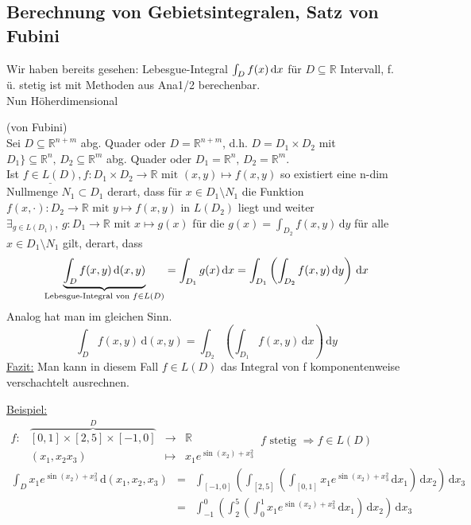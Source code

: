 \subsection{Berechnung von Gebietsintegralen, Satz von Fubini}
Wir haben bereits gesehen: Lebesgue-Integral $\int_{D} f(x) \,\text{d}x$ für $D \subseteq \mathbb{R}$ Intervall, f. ü. stetig ist mit Methoden aus Ana1/2 berechenbar.\\
Nun Höherdimensional\\
\begin{satz}(von Fubini)\\
    Sei $D \subseteq \mathbb{R}^{n+m}$ abg. Quader oder $D = \mathbb{R}^{n+m}$, d.h. $D = D_1 \times D_2$ mit $D_1 \}\subseteq \mathbb{R}^n, \, D_2 \subseteq \mathbb{R}^m$ abg. Quader oder $D_1 = \mathbb{R}^n, \, D_2 = \mathbb{R}^m.$\\
    Ist $\underline{f\in L(D)}, f\colon D_1 \times D_2 \to \mathbb{R} \text{ mit } (x,y) \mapsto f(x,y)$ so existiert eine n-dim Nullmenge $N_1 \subset D_1$ derart, dass für $x \in D_1 \setminus N_1$ die Funktion $f(x,\cdot)\colon D_2 \to \mathbb{R} \text{ mit } y \mapsto f(x,y)$ in $L(D_2)$ liegt und weiter $\exists_{g \in L(D_1)}, \, g\colon D_1 \to \mathbb{R} \text{ mit } x \mapsto g(x)$ für die $g(x) = \int_{D_2} f(x,y) \, \text{d}y$ für alle $x\in D_1\setminus N_1$ gilt, derart, dass \[\underbrace{\int_D f(x,y) \,\text{d}(x,y)}_{\text{Lebesgue-Integral von } f\in L(D)} = \int_{{D_1}} g(x) \,\text{d}x = \int_{D_1} \left( \int_{D_2} f(x,y)\, \text{d}y \right) \, \text{d}x \]
    Analog hat man im gleichen Sinn.
    \[\int_D f(x,y) \, \text{d}(x,y) = \int_{D_2} \left( \int_{D_1} f(x,y) \, \text{d}x\right) \,\text{d}y\]
    \underline{Fazit:} Man kann in diesem Fall $f\in L(D)$ das Integral von f komponentenweise verschachtelt ausrechnen.
\end{satz}

\underline{Beispiel:} $\begin{matrix}
    f\colon & \overbrace{[0,1]\times [2,5]\times [-1,0]}^D &\to& \mathbb{R}\\
    & (x_1,x_2x_3)&\mapsto& x_1 e^{\sin (x_2) + x_3^2}
\end{matrix} \, f \text{ stetig } \Rightarrow f \in L(D)$
\begin{align*}
    \int_D x_1 e^{\sin (x_2) + x_3^2} \, \text{d}(x_1, x_2, x_3) &=& \int_{[-1,0]} \left( \int_{[2,5]} \left(\int_{[0,1]} x_1 e^{\sin (x_2) + x_3^2} \, \text{d}x_1 \right) \, \text{d}x_2 \right) \, \text{d}x_3\\
    &=& \int_{-1}^0 \left(\int_2^5\left(\int_0^1 x_1 e^{\sin (x_2) + x_3^2}\, \text{d}x_1 \right) \, \text{d}x_2 \right) \, \text{d}x_3
\end{align*}

